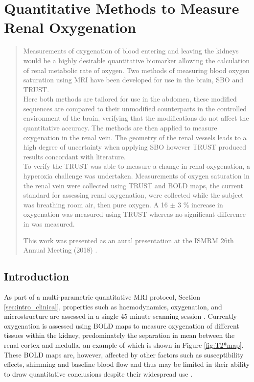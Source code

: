 \chapter{Quantitative Methods to Measure Renal Oxygenation}
\label{chap:TRUST}

\begin{abstract}
	Measurements of oxygenation of blood entering and leaving the kidneys would be a highly desirable quantitative biomarker allowing the calculation of renal metabolic rate of oxygen. Two methods of measuring blood oxygen saturation using \acs{MRI} have been developed for use in the brain,  \ac{SBO} and \ac{TRUST}.\\
	
	Here both methods are tailored for use in the abdomen, these modified sequences are compared to their unmodified counterparts in the controlled environment of the brain, verifying that the modifications do not affect the quantitative accuracy. The methods are then applied to measure oxygenation in the renal vein. The geometry of the renal vessels leads to a high degree of uncertainty when applying \ac{SBO} however \ac{TRUST} produced results concordant with literature.\\
	
	To verify the \ac{TRUST} was able to measure a change in renal oxygenation, a hyperoxia challenge was undertaken. Measurements of oxygen saturation in the renal vein were collected using \ac{TRUST} and \acs{BOLD} \ttwostar maps, the current standard for assessing renal oxygenation, were collected while the subject was breathing room air, then pure oxygen. A 16 $\pm$ 3 \% increase in oxygenation was measured using \ac{TRUST} whereas no significant difference in \ttwostar was measured. 
	
	This work was presented as an aural presentation at the \ac{ISMRM} 26th Annual Meeting (2018) \cite{daniel_applying_2018}.
	
\end{abstract}
\newpage
\acresetall

\section{Introduction}
As part of a multi-parametric quantitative \ac{MRI} protocol, Section \ref{sec:intro_clinical}, properties such as haemodynamics, oxygenation, and microstructure are assessed in a single 45 minute scanning session \cite{cox_multiparametric_2017, buchanan_quantitative_2019}. Currently oxygenation is assessed using \ac{BOLD} \ttwostar maps to measure oxygenation of different tissues within the kidney, predominately the separation in mean \ttwostar between the renal cortex and medulla, an example of which is shown in Figure \ref{fig:T2*map}. These \ac{BOLD} \ttwostar maps are, however, affected by other factors such as susceptibility effects, shimming and baseline blood flow and thus may be limited in their ability to draw quantitative conclusions despite their widespread use \cite{pruijm_blood_2017, niendorf_how_nodate}. 

